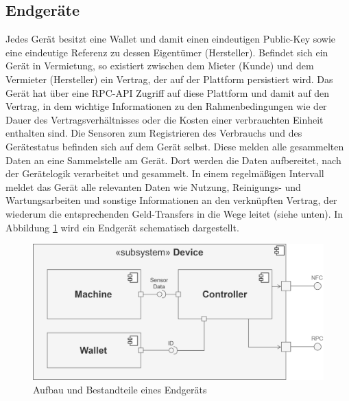 \subsection{Endgeräte}
\label{subsec:iot_usecase:solution:device}
Jedes Gerät besitzt eine Wallet und damit einen eindeutigen Public-Key sowie eine eindeutige Referenz zu dessen Eigentümer (Hersteller). Befindet sich ein Gerät in Vermietung, so existiert zwischen dem Mieter (Kunde) und dem Vermieter (Hersteller) ein Vertrag, der auf der Plattform persistiert wird. Das Gerät hat über eine \ac{RPC}-\ac{API} Zugriff auf diese Plattform und damit auf den Vertrag, in dem wichtige Informationen zu den Rahmenbedingungen wie der Dauer des Vertragsverhältnisses oder die Kosten einer verbrauchten Einheit enthalten sind. Die Sensoren zum Registrieren des Verbrauchs und des Gerätestatus befinden sich auf dem Gerät selbst. Diese melden alle gesammelten Daten an eine Sammelstelle am Gerät. Dort werden die Daten aufbereitet, nach der Gerätelogik verarbeitet und gesammelt. In einem regelmäßigen Intervall meldet das Gerät alle relevanten Daten wie Nutzung, Reinigungs- und Wartungsarbeiten und sonstige Informationen an den verknüpften Vertrag, der wiederum die entsprechenden Geld-Transfers in die Wege leitet (siehe unten). In Abbildung \ref{fig:chapter04:usecase_device} wird ein Endgerät schematisch dargestellt.

\begin{figure}[htbp]
 \centering
 \includegraphics[width=1.0\textwidth]{gfx/Device_Component_UML.png}
 \caption{Aufbau und Bestandteile eines Endgeräts}
 \label{fig:chapter04:usecase_device}
\end{figure}

